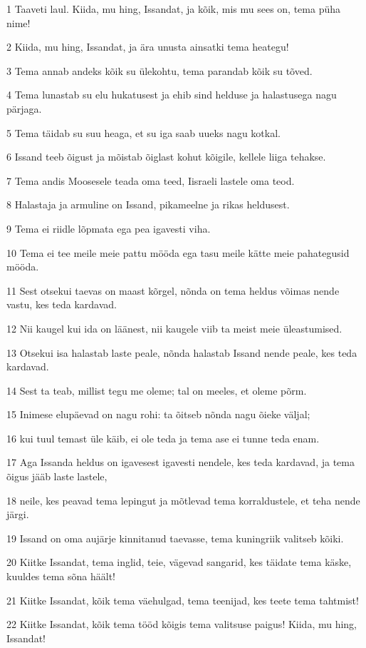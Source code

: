 \par 1 Taaveti laul. Kiida, mu hing, Issandat, ja kõik, mis mu sees on, tema püha nime!
\par 2 Kiida, mu hing, Issandat, ja ära unusta ainsatki tema heategu!
\par 3 Tema annab andeks kõik su ülekohtu, tema parandab kõik su tõved.
\par 4 Tema lunastab su elu hukatusest ja ehib sind helduse ja halastusega nagu pärjaga.
\par 5 Tema täidab su suu heaga, et su iga saab uueks nagu kotkal.
\par 6 Issand teeb õigust ja mõistab õiglast kohut kõigile, kellele liiga tehakse.
\par 7 Tema andis Moosesele teada oma teed, Iisraeli lastele oma teod.
\par 8 Halastaja ja armuline on Issand, pikameelne ja rikas heldusest.
\par 9 Tema ei riidle lõpmata ega pea igavesti viha.
\par 10 Tema ei tee meile meie pattu mööda ega tasu meile kätte meie pahategusid mööda.
\par 11 Sest otsekui taevas on maast kõrgel, nõnda on tema heldus võimas nende vastu, kes teda kardavad.
\par 12 Nii kaugel kui ida on läänest, nii kaugele viib ta meist meie üleastumised.
\par 13 Otsekui isa halastab laste peale, nõnda halastab Issand nende peale, kes teda kardavad.
\par 14 Sest ta teab, millist tegu me oleme; tal on meeles, et oleme põrm.
\par 15 Inimese elupäevad on nagu rohi: ta õitseb nõnda nagu õieke väljal;
\par 16 kui tuul temast üle käib, ei ole teda ja tema ase ei tunne teda enam.
\par 17 Aga Issanda heldus on igavesest igavesti nendele, kes teda kardavad, ja tema õigus jääb laste lastele,
\par 18 neile, kes peavad tema lepingut ja mõtlevad tema korraldustele, et teha nende järgi.
\par 19 Issand on oma aujärje kinnitanud taevasse, tema kuningriik valitseb kõiki.
\par 20 Kiitke Issandat, tema inglid, teie, vägevad sangarid, kes täidate tema käske, kuuldes tema sõna häält!
\par 21 Kiitke Issandat, kõik tema väehulgad, tema teenijad, kes teete tema tahtmist!
\par 22 Kiitke Issandat, kõik tema tööd kõigis tema valitsuse paigus! Kiida, mu hing, Issandat!

